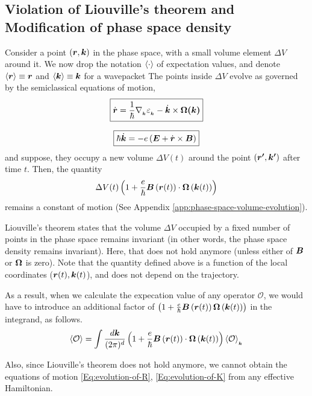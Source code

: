 \documentclass{revtex4-2}
\renewcommand\vec[1]{\ensuremath\boldsymbol{#1}} %
\begin{document}
\subsection{Violation of Liouville's theorem and Modification of phase space density}
Consider a point $\left(\vec{r},\vec{k}\right)$ in the phase space, with a small volume element $\Delta V$ around it. We now drop the notation $\expval{\cdot}$ of expectation values, and denote $\expval{\vec{r}} \equiv \vec{r}$ and $\expval{\vec{k}} \equiv \vec{k}$ for a wavepacket The points inside $\Delta V$ evolve as governed by the semiclassical equations of motion,
\begin{equation}\label{Eq:evolution-of-R}
	\boxed{\dot{\vec{r}} = \frac{1}{\hbar} \nabla{_{_{\vec{k}}}} \varepsilon_{_{\vec{k}}} - \dot{\vec{k}} \times \vec{\Omega(\vec{k})}}
\end{equation}

\begin{equation}\label{Eq:evolution-of-K}
	\boxed{\hbar \dot{\vec{k}} = -e\left(\vec{E} + \dot{\vec{r}} \times \vec{B} \right)}
\end{equation}
and suppose, they occupy a new volume $\Delta V(t)$ around the point $\left(\vec{r'},\vec{k'}\right)$ after time $t$. Then, the quantity $$\Delta V(t) \left(1 + \frac{e}{\hbar} \vec{B}\left(\vec{r}(t)\right) \cdot  \vec{\Omega}\left(\vec{k}(t)\right)\right)$$ remains a constant of motion (See Appendix \ref{app:phase-space-volume-evolution}).

Liouville's theorem states that the volume $\Delta V$ occupied by a fixed number of points in the phase space remains invariant (in other words, the phase space density remains invariant). Here, that does not hold anymore (unless either of $\vec{B}$ or $\vec{\Omega}$ is zero). Note that the quantity defined above is a function of the local coordinates ($\vec{r}(t), \vec{k}(t)$), and does not depend on the trajectory.

As a result, when we calculate the expecation value of any operator $\mathcal{O}$, we would have to introduce an additional factor of $\left(1 + \frac{e}{\hbar} \vec{B}\left(\vec{r}(t)\right) \vec{\Omega}\left(\vec{k}(t)\right)\right)$ in the integrand, as follows.
$$\expval{\mathcal{O}} = \int \frac{d\vec{k}}{(2\pi)^d} \left(1 + \frac{e}{\hbar} \vec{B}\left(\vec{r}(t)\right) \cdot  \vec{\Omega}\left(\vec{k}(t)\right)\right) \expval{\mathcal{O}}_{_{\vec{k}}}$$

Also, since Liouville's theorem does not hold anymore, we cannot obtain the equations of motion \eqref{Eq:evolution-of-R}, \eqref{Eq:evolution-of-K} from any effective Hamiltonian.
\end{document}

